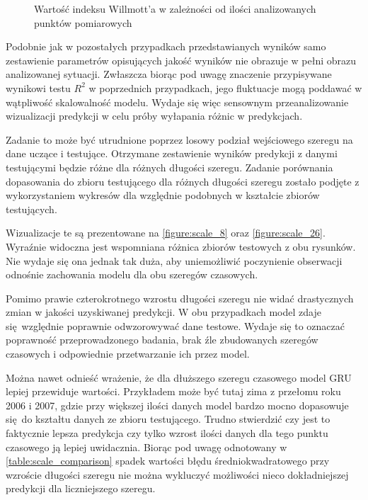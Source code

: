 \documentclass[10pt,a4paper]{article}
\begin{document}
\begin{figure}[!ht]
	\centering
	\caption{Wartość indeksu Willmott'a w zależności od ilości analizowanych punktów pomiarowych}
	\label{figure:scale_willmott}
\end{figure}
\FloatBarrier

Podobnie jak w pozostałych przypadkach przedstawianych wyników samo zestawienie parametrów opisujących jakość wyników nie obrazuje w pełni obrazu analizowanej sytuacji. Zwłaszcza biorąc pod uwagę znaczenie przypisywane wynikowi testu $R^2$ w poprzednich przypadkach, jego fluktuacje mogą poddawać w wątpliwość skalowalność modelu. Wydaje się więc sensownym przeanalizowanie wizualizacji predykcji w celu próby wyłapania różnic w predykcjach. 

Zadanie to może być utrudnione poprzez losowy podział wejściowego szeregu na dane uczące i testujące. Otrzymane zestawienie wyników predykcji z danymi testującymi będzie różne dla różnych długości szeregu. Zadanie porównania dopasowania do zbioru testującego dla różnych długości szeregu zostało podjęte z wykorzystaniem wykresów dla względnie podobnych w kształcie zbiorów testujących. 

Wizualizacje te są prezentowane na \autoref{figure:scale_8} oraz \autoref{figure:scale_26}. Wyraźnie widoczna jest wspomniana różnica zbiorów testowych z obu rysunków. Nie wydaje się ona jednak tak duża, aby uniemożliwić poczynienie obserwacji odnośnie zachowania modelu dla obu szeregów czasowych.

Pomimo prawie czterokrotnego wzrostu długości szeregu nie widać drastycznych zmian w jakości uzyskiwanej predykcji. W obu przypadkach model zdaje się względnie poprawnie odwzorowywać dane testowe. Wydaje się to oznaczać poprawność przeprowadzonego badania, brak źle zbudowanych szeregów czasowych i odpowiednie przetwarzanie ich przez model. 

Można nawet odnieść wrażenie, że dla dłuższego szeregu czasowego model GRU lepiej przewiduje wartości. Przykładem może być tutaj zima z przełomu roku 2006 i 2007, gdzie przy większej ilości danych model bardzo mocno dopasowuje się do kształtu danych ze zbioru testującego. Trudno stwierdzić czy jest to faktycznie lepsza predykcja czy tylko wzrost ilości danych dla tego punktu czasowego ją lepiej uwidacznia. Biorąc pod uwagę odnotowany w \autoref{table:scale_comparison} spadek wartości błędu średniokwadratowego przy wzroście długości szeregu nie można wykluczyć możliwości nieco dokładniejszej predykcji dla liczniejszego szeregu. 
\end{document}
